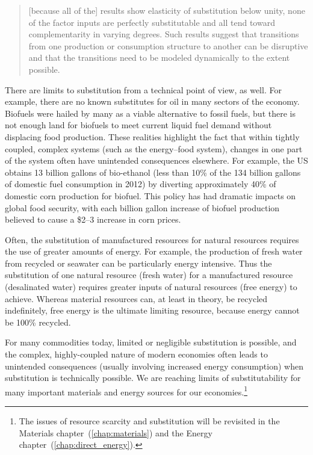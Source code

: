 \begin{quote}
	[because all of the] results show elasticity of substitution below unity, 
	none of the factor inputs are perfectly substitutable and 
	all tend toward complementarity in varying degrees. 
	Such results suggest that transitions 
	from one production or consumption structure to another 
	can be disruptive and that the transitions 
	need to be modeled dynamically to the extent possible.\cite[p.~8]{de-Wit:2013aa}
\end{quote}

There are limits to substitution from a technical point of view, as well.
For example, there are no known substitutes for oil 
in many sectors of the economy.\cite{Hirsch2005}
Biofuels were hailed by many as a viable alternative to fossil fuels, but
there is not enough land for biofuels to meet current liquid fuel demand
without displacing food production.
These realities highlight the fact that within tightly coupled, 
complex systems (such as the energy--food system), %
changes in one part of the system often have unintended consequences elsewhere.
For example, 
the US obtains 13 billion gallons of bio-ethanol 
(less than 10\% of the 134 billion gallons of domestic fuel consumption in 2012)
by diverting approximately 40\%
of domestic corn production for biofuel.\cite{EIA2014, USDA2014}
This policy has had dramatic impacts on global food security,
with each billion gallon increase of biofuel production believed to cause
a \$2--3 increase in corn prices.\cite{Kemick2013}

Often, the substitution of manufactured resources for natural resources
requires the use of greater amounts of energy.
For example, the production of fresh water from recycled or seawater
can be particularly energy intensive.
Thus the substitution of one natural resource (fresh water)
for a manufactured resource (desalinated water)
requires greater inputs of natural resources (free energy) to achieve.
Whereas material resources can, at least in theory,
be recycled indefinitely,
free energy is the ultimate limiting resource, 
because energy cannot be 100\% recycled.

For many commodities today, limited or negligible substitution is possible,
and the complex, highly-coupled nature of modern economies
often leads to unintended consequences (usually involving increased energy consumption)
when substitution is technically possible.
We are reaching limits of substitutability for many important 
materials and energy sources for our 
economies.\footnote{The issues of resource scarcity and substitution
	will be revisited in 
	the Materials chapter~(\ref{chap:materials}) and
	the Energy chapter~(\ref{chap:direct_energy}).}


